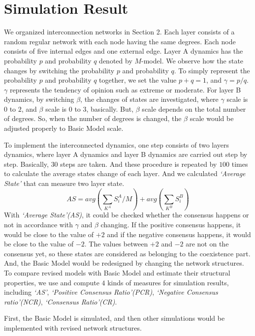 \documentclass[english]{cccconf}
\begin{document}
\section{Simulation Result}
We organized interconnection networks in Section 2. Each layer consists of a random regular network with each node having the same degrees\cite{bela2001}. Each node consists of five internal edges and one external edge. Layer A dynamics has the probability $p$ and probability $q$ denoted by $M$-model. We observe how the state changes by switching the probability $p$ and probability $q$. To simply represent the probability $p$ and probability $q$ together, we set the value $p+q=1$, and $\gamma = p/q$. $\gamma$ represents the tendency of opinion such as extreme or moderate\cite{alvarez2016}. For layer B dynamics, by switching $\beta$, the changes of states are investigated, where $\gamma$ scale is $0$ to $2$, and $\beta$ scale is $0$ to $3$, basically. But, $\beta$ scale depends on the total number of degrees. So, when the number of degrees is changed, the $\beta$ scale would be adjusted properly to Basic Model scale.

To implement the interconnected dynamics, one step consists of two layers dynamics, where layer A dynamics and layer B dynamics are carried out step by step. Basically, $30$ steps are taken. And these procedure is repeated by $100$ times to calculate the average states change of each layer. And we calculated \textit{`Average State'} that can measure two layer state. 
\begin{equation}
AS = avg\left( {\sum\limits_{{K^A}} {S_i^A/M} } \right) + avg\left( {\sum\limits_{{K^B}} {S_i^B} } \right)
\end{equation}
With \textit{`Average State'(AS)}, it could be checked whether the consensus happens or not in accordance with $\gamma$ and $\beta$ changing.  If the positive consensus happens, it would be close to the value of $+2$ and if the negative consensus happens, it would be close to the value of $-2$. The values between $+2$ and $-2$ are not on the consensus yet, so these states are considered as belonging to the coexistence part.
And, the Basic Model would be redesigned by changing the network structures. To compare revised models with Basic Model and estimate their structural properties, we use and compute $4$ kinds of measures for simulation results, including \textit{`AS'}, \textit{`Positive Consensus Ratio'(PCR)}, \textit{`Negative Consensus ratio'(NCR)}, \textit{`Consensus Ratio'(CR)}.

First, the Basic Model is simulated, and then other simulations would be implemented with revised network structures.
\end{document}
